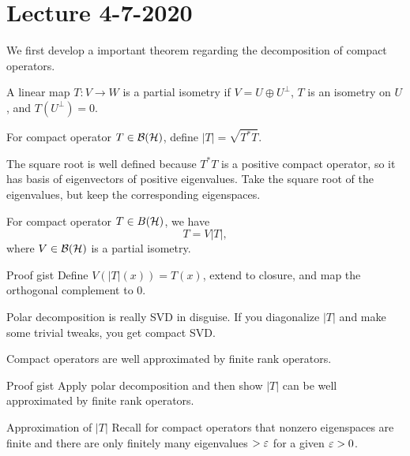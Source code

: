 \section{Lecture 4-7-2020}
We first develop a important theorem regarding the decomposition of compact operators.
\begin{dfn}
    A linear map $T: V \rightarrow W$ is a partial isometry if $V = U \oplus U^\perp$, $T$ is an isometry on $U$, and $T(U^\perp) = 0$.
\end{dfn}
\begin{dfn}
    For compact operator $T \in {\mathcal B}({\mathcal H})$, define $|T| = \sqrt{T^*T}$.
\end{dfn}
\begin{remark}
    The square root is well defined because $T^*T$ is a positive compact operator, so it has basis of eigenvectors of positive eigenvalues. Take the square root of the eigenvalues, but keep the corresponding eigenspaces.
\end{remark}
\begin{thm}
    For compact operator $T \in B({\mathcal H})$, we have
    \[
        T = V|T|,
    \]
    where $V \in {\mathcal B}({\mathcal H})$ is a partial isometry.
\end{thm}
\begin{details}{Proof gist}
    Define $V(|T|(x)) = T(x)$, extend to closure, and map the orthogonal complement to 0.
\end{details}
\begin{remark}
    Polar decomposition is really SVD in disguise. If you diagonalize $|T|$ and make some trivial tweaks, you get compact SVD.
\end{remark}
\begin{thm}
    Compact operators are well approximated by finite rank operators.
\end{thm}
\begin{details}{Proof gist}
    Apply polar decomposition and then show $|T|$ can be well approximated by finite rank operators. 
\end{details}
\begin{details}{Approximation of $|T|$}
Recall for compact operators that nonzero eigenspaces are finite and there are only finitely many eigenvalues $> \varepsilon$ for a given $\varepsilon > 0$.
\end{details}
